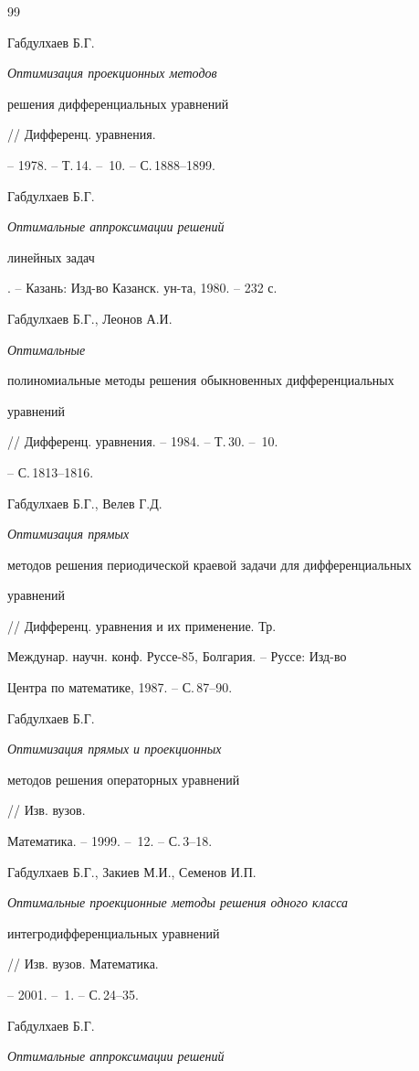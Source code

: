 \begin{thebibliography}{99}







Габдулхаев Б.Г. {\it Оптимизация проекционных методов


решения дифференциальных уравнений} // Дифференц. уравнения.


-- 1978. -- Т.\,14. -- \No\,10. -- С.\,1888--1899.




Габдулхаев Б.Г. {\it Оптимальные аппроксимации решений


линейных задач}. -- Казань: Изд-во Казанск. ун-та, 1980. -- 232 с.




Габдулхаев Б.Г., Леонов А.И. {\it Оптимальные


полиномиальные методы решения обыкновенных дифференциальных


уравнений} // Дифференц. уравнения. -- 1984. -- Т.\,30. -- \No\,10.


-- С.\,1813--1816.




Габдулхаев Б.Г., Велев Г.Д. {\it Оптимизация прямых


методов решения периодической краевой задачи для дифференциальных


уравнений} // Дифференц. уравнения и их применение. Тр.


Междунар. научн. конф. Руссе-85, Болгария. -- Руссе: Изд-во 


Центра по математике, 1987. -- С.\,87--90.




Габдулхаев Б.Г. {\it Оптимизация прямых и проекционных


методов решения операторных уравнений} // Изв. вузов.


Математика. -- 1999. -- \No\,12. -- С.\,3--18.




Габдулхаев Б.Г., Закиев М.И., Семенов И.П.


{\it Оптимальные проекционные методы решения одного класса


интегродифференциальных уравнений} // Изв. вузов. Математика.


-- 2001. -- \No\,1. -- С.\,24--35.




Габдулхаев Б.Г. {\it Оптимальные аппроксимации решений


}
\end{thebibliography}

